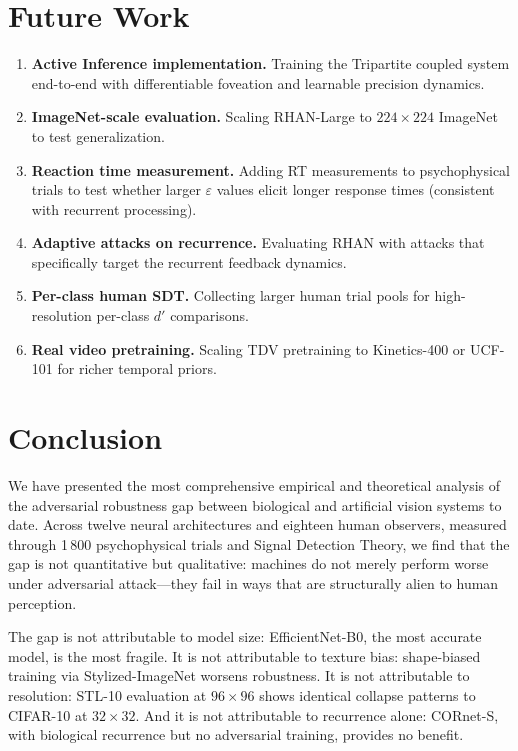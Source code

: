 \documentclass[12pt,a4paper]{article}
\begin{document}
\section{Future Work}
\label{sec:future}

\begin{enumerate}[leftmargin=1.5em]
  \item \textbf{Active Inference implementation.} Training the Tripartite
        coupled system end-to-end with differentiable foveation and
        learnable precision dynamics.
  \item \textbf{ImageNet-scale evaluation.} Scaling RHAN-Large to
        $224{\times}224$ ImageNet to test generalization.
  \item \textbf{Reaction time measurement.} Adding RT measurements to
        psychophysical trials to test whether larger $\varepsilon$ values
        elicit longer response times (consistent with recurrent processing).
  \item \textbf{Adaptive attacks on recurrence.} Evaluating RHAN with
        attacks that specifically target the recurrent feedback dynamics.
  \item \textbf{Per-class human SDT.} Collecting larger human trial pools
        for high-resolution per-class $d'$ comparisons.
  \item \textbf{Real video pretraining.} Scaling TDV pretraining to
        Kinetics-400 or UCF-101 for richer temporal priors.
\end{enumerate}

\section{Conclusion}
\label{sec:conclusion}

We have presented the most comprehensive empirical and theoretical analysis
of the adversarial robustness gap between biological and artificial vision
systems to date. Across twelve neural architectures and eighteen human
observers, measured through 1\,800 psychophysical trials and Signal Detection
Theory, we find that the gap is not quantitative but qualitative: machines
do not merely perform worse under adversarial attack---they fail in ways that
are structurally alien to human perception.

The gap is not attributable to model size: EfficientNet-B0, the most accurate
model, is the most fragile. It is not attributable to texture bias:
shape-biased training via Stylized-ImageNet worsens robustness. It is not
attributable to resolution: STL-10 evaluation at $96{\times}96$ shows
identical collapse patterns to CIFAR-10 at $32{\times}32$. And it is not
attributable to recurrence alone: CORnet-S, with biological recurrence but
no adversarial training, provides no benefit.
\end{document}
